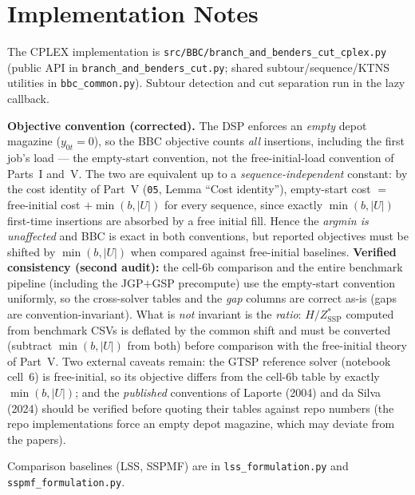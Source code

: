 \documentclass[11pt,a4paper]{article}
\theoremstyle{plain}
\theoremstyle{definition}
\newcommand{\ZSSP}{Z_{\mathrm{SSP}}^{*}}
\begin{document}
\section{Implementation Notes}
\label{sec:impl}

The CPLEX implementation is \texttt{src/BBC/branch\_and\_benders\_cut\_cplex.py} (public API
in \texttt{branch\_and\_benders\_cut.py}; shared subtour/sequence/KTNS utilities in
\texttt{bbc\_common.py}). Subtour detection and cut separation run in the lazy callback.

\begin{warnbox}
\textbf{Objective convention (corrected).}
The DSP enforces an \emph{empty} depot magazine ($y_{0t}=0$), so the BBC objective counts
\emph{all} insertions, including the first job's load --- the empty-start convention, not
the free-initial-load convention of Parts~I and~V. The two are equivalent up to a
\emph{sequence-independent} constant: by the cost identity of Part~V
(\texttt{05}, Lemma ``Cost identity''), empty-start cost $=$ free-initial cost
$+\min(b,|U|)$ for every sequence, since exactly $\min(b,|U|)$ first-time insertions are
absorbed by a free initial fill. Hence the \emph{argmin is unaffected} and BBC is exact in
both conventions, but reported objectives must be shifted by $\min(b,|U|)$ when compared
against free-initial baselines.
\textbf{Verified consistency (second audit):} the cell-6b comparison and the entire
benchmark pipeline (including the JGP$+$GSP precompute) use the empty-start convention
uniformly, so the cross-solver tables and the \emph{gap} columns are correct as-is
(gaps are convention-invariant). What is \emph{not} invariant is the \emph{ratio}:
$H/\ZSSP$ computed from benchmark CSVs is deflated by the common shift and must be
converted (subtract $\min(b,|U|)$ from both) before comparison with the free-initial
theory of Part~V. Two external caveats remain: the GTSP reference solver (notebook
cell~6) is free-initial, so its objective differs from the cell-6b table by exactly
$\min(b,|U|)$; and the \emph{published} conventions of Laporte (2004) and da Silva
(2024) should be verified before quoting their tables against repo numbers (the repo
implementations force an empty depot magazine, which may deviate from the papers).
\end{warnbox}

\noindent Comparison baselines
(LSS, SSPMF) are in \texttt{lss\_formulation.py} and \texttt{sspmf\_formulation.py}.



\end{document}

